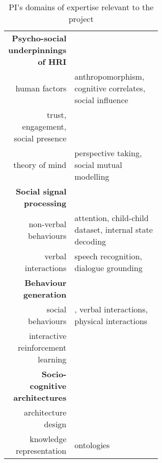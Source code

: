 \begin{table}[h]
    \centering
    \caption{\small PI's domains of expertise relevant to the \project project}
    \begin{tabular}{rp{0.6\linewidth}}
        \toprule
        \textbf{Psycho-social underpinnings of HRI} \\  
        human factors & \small anthropomorphism\cite{lemaignan2014dynamics}, cognitive
        correlates\cite{lemaignan2014cognitive}, social influence\cite{winkle2019effective} \\
        trust, engagement, social presence & \small \cite{flook2019impact}\cite{lemaignan2015youre}\cite{fink2014which}\cite{irfan2018social}\cite{wijnen2020performing} \\
        theory of mind & \small perspective taking\cite{ros2010which, warnier2012when}, social mutual modelling\cite{lemaignan2015mutual,dillenbourg2016symmetry} \\
        \midrule
        \textbf{Social signal processing}\\
        non-verbal behaviours & \small attention\cite{lemaignan2016realtime},
        child-child dataset\cite{lemaignan2018pinsoro}, internal state decoding\cite{bartlett2019what} \\
        verbal interactions & \small speech recognition\cite{kennedy2017child}, dialogue grounding\cite{lemaignan2011grounding} \\
        \midrule
        \textbf{Behaviour generation} \\
        social behaviours & \small \cite{lallee2011towards}, verbal interactions\cite{wallbridge2019generating, wallbridge2019towards}, physical interactions\cite{gharbi2013natural} \\
        interactive reinforcement learning & \small
        \cite{senft2017leveraging,senft2017supervised, senft2019teaching,  winkle2020insitu} \\
        \midrule
        \textbf{Socio-cognitive architectures} \\
        architecture design & \small \cite{lemaignan2017artificial, baxter2016cognitive,lemaignan2014challenges,lallee2012towards, mallet2010genom3} \\
        knowledge representation & \small
        ontologies\cite{lemaignan2010oro, lemaignan2013explicit} \\    

\end{tabular}
\end{table}
